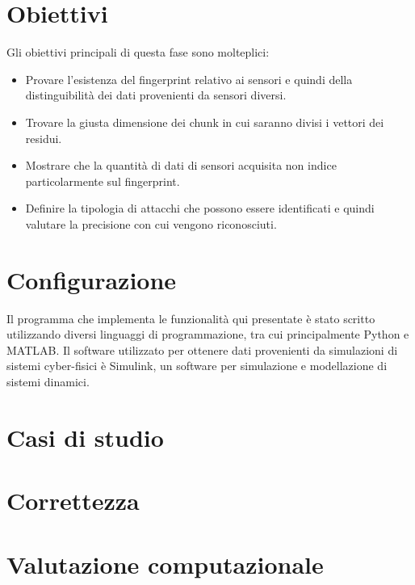 \documentclass[Lau,binding=0.6cm]{sapthesis}
\begin{document}
\section{Obiettivi}
Gli obiettivi principali di questa fase sono molteplici:
\begin{itemize}
    \item Provare l'esistenza del fingerprint relativo ai sensori e quindi della distinguibilit\`a dei dati provenienti da sensori diversi.
    \item Trovare la giusta dimensione dei chunk in cui saranno divisi i vettori dei residui.
    \item Mostrare che la quantit\`a di dati di sensori acquisita non indice particolarmente sul fingerprint.
    \item Definire la tipologia di attacchi che possono essere identificati e quindi valutare la precisione con cui vengono riconosciuti.
 \end{itemize}

\section{Configurazione}
Il programma che implementa le funzionalit\`a qui presentate \`e stato scritto utilizzando diversi linguaggi di programmazione, tra cui principalmente Python e MATLAB.
Il software utilizzato per ottenere dati provenienti da simulazioni di sistemi cyber-fisici \`e Simulink, un software per simulazione e modellazione di sistemi dinamici.

\section{Casi di studio}

\section{Correttezza}

\section{Valutazione computazionale}
\end{document}
